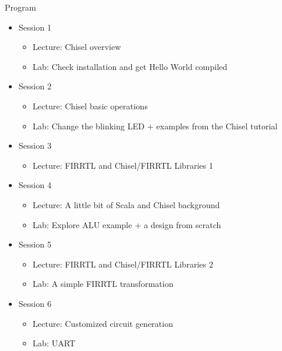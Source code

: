 \documentclass[xcolor=pdflatex,dvipsnames,table]{beamer}
\begin{document}
\begin{frame}[fragile]{Program}
\begin{itemize}
\item Session 1
\begin{itemize}
\item Lecture: Chisel overview
\item Lab: Check installation and get Hello World compiled
\end{itemize}
\item Session 2
\begin{itemize}
\item Lecture: Chisel basic operations
\item Lab: Change the blinking LED + examples from the Chisel tutorial
\end{itemize}
\item Session 3
\begin{itemize}
\item Lecture: FIRRTL and Chisel/FIRRTL Libraries 1
\end{itemize}
\item Session 4
\begin{itemize}
\item Lecture: A little bit of Scala and Chisel background 
\item Lab: Explore ALU example + a design from scratch
\end{itemize}
\item Session 5
\begin{itemize}
\item Lecture: FIRRTL and Chisel/FIRRTL Libraries 2
\item Lab: A simple FIRRTL transformation
\end{itemize}
\item Session 6
\begin{itemize}
\item Lecture: Customized circuit generation
\item Lab: UART
\end{itemize}
\end{itemize}
\end{frame}
\end{document}
